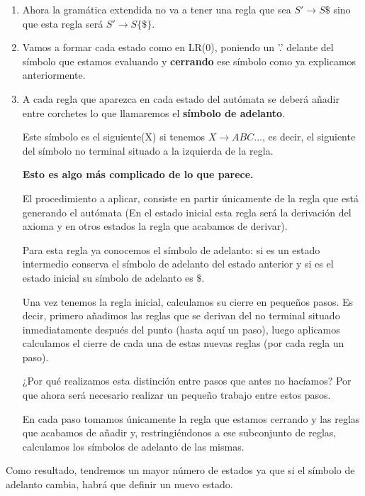 \documentclass{apuntes}
\begin{document}
\begin{enumerate}
\item Ahora la gramática extendida no va a tener una regla que sea $S' \rightarrow S\$$ sino que esta regla será $S' \rightarrow S\{\$\}$.
\item Vamos a formar cada estado como en LR(0), poniendo un '.' delante del símbolo que estamos evaluando y \textbf{cerrando} ese símbolo como ya explicamos anteriormente.
\item A cada regla que aparezca en cada estado del autómata se deberá añadir entre corchetes lo que llamaremos el \textbf{símbolo de adelanto}.

Este símbolo es el siguiente(X) si tenemos $X \rightarrow ABC...$, es decir, el siguiente del símbolo no terminal situado a la izquierda de la regla.

\textbf{Esto es algo más complicado de lo que parece.}

El procedimiento a aplicar, consiste en partir únicamente de la regla que está generando el autómata (En el estado inicial esta regla será la derivación del axioma y en otros estados la regla que acabamos de derivar).

Para esta regla ya conocemos el símbolo de adelanto: si es un estado intermedio conserva el símbolo de adelanto del estado anterior y si es el estado inicial su símbolo de adelanto es $\$$.

Una vez tenemos la regla inicial, calculamos su cierre en pequeños pasos. Es decir, primero añadimos las reglas que se derivan del no terminal situado inmediatamente después del punto (hasta aquí un paso), luego aplicamos calculamos el cierre de cada una de estas nuevas reglas (por cada regla un paso).

¿Por qué realizamos esta distinción entre pasos que antes no hacíamos? Por que ahora será necesario realizar un pequeño trabajo entre estos pasos.

En cada paso tomamos únicamente la regla que estamos cerrando y las reglas que acabamos de añadir y, restringiéndonos a ese subconjunto de reglas, calculamos los símbolos de adelanto de las mismas.

\end{enumerate}

Como resultado, tendremos un mayor número de estados ya que si el símbolo de adelanto cambia, habrá que definir un nuevo estado.
\end{document}

